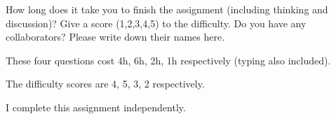 \documentclass{oxmathproblems}
\begin{document}
\begin{questions}
\begin{Solution}
\begin{parts}
\end{parts}
\end{Solution}
\newpage

\miquestion
How long does it take you to finish the assignment (including thinking and discussion)?
Give a score (1,2,3,4,5) to the difficulty.
Do you have any collaborators?
Please write down their names here.

\begin{Solution}

These four questions cost 4h, 6h, 2h, 1h respectively (typing also included).

The difficulty scores are 4, 5, 3, 2 respectively.

I complete this assignment independently.
\end{Solution}

\end{questions}
\end{document}
